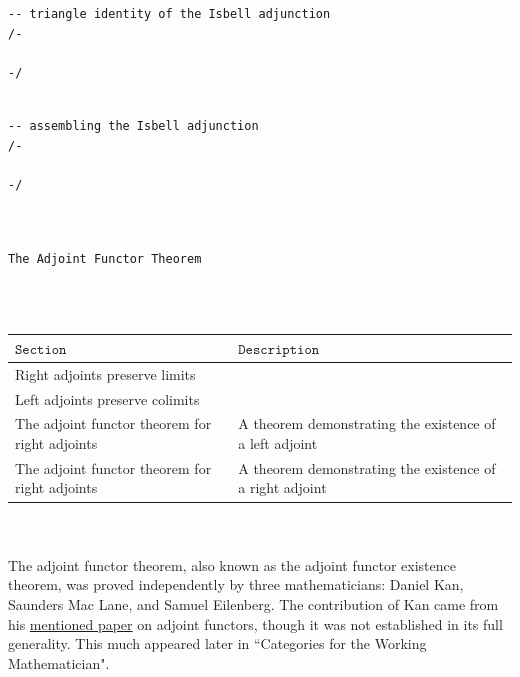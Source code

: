 \documentclass{book}
\theoremstyle{definition}
\newcounter{lcounter}
\renewcommand{\chapter}[1]{
\newpage
{
\Huge 
\begin{center}
\ \\
\ \\
\thispagestyle{empty}
\texttt{#1}
\end{center}}
\ \\
\ \\
}
\begin{document}
{{\begin{center}
\begin{tcolorbox}[width=5in,colback={white},title={\begin{center}\texttt{Lean \thelcounter} \addtocounter{lcounter}{1}  \end{center}},colbacktitle=Blue,coltitle=black]
\begin{verbatim}
-- triangle identity of the Isbell adjunction
/-

-/

\end{verbatim}
\end{tcolorbox}
\end{center}

\begin{center}
\begin{tcolorbox}[width=5in,colback={white},title={\begin{center}\texttt{Lean \thelcounter} \addtocounter{lcounter}{1}  \end{center}},colbacktitle=Blue,coltitle=black]
\begin{verbatim}

-- assembling the Isbell adjunction
/-

-/

\end{verbatim}
\end{tcolorbox}
\end{center}

\chapter{The Adjoint Functor Theorem}

{\footnotesize
\begin{center}
\begin{tabular}{|| l || l ||} 
 \hline
 $\texttt{Section}$ & $\texttt{Description}$ \\
 \hline
\hline
Right adjoints preserve limits &  \\
\hline
Left adjoints preserve colimits &  \\
\hline
The adjoint functor theorem for right adjoints & A theorem demonstrating the existence of a left adjoint \\
\hline
The adjoint functor theorem for right adjoints & A theorem demonstrating the existence of a right adjoint  \\
\hline
\end{tabular}
\end{center}}
\ \\
\ \\

The adjoint functor theorem, also known as the adjoint functor existence theorem, was proved independently by three mathematicians: Daniel Kan, Saunders Mac Lane, and Samuel Eilenberg. The contribution of Kan came from his \href{https://www.ams.org/journals/tran/1958-087-02/S0002-9947-1958-0131451-0/S0002-9947-1958-0131451-0.pdf}{mentioned paper} on adjoint functors, though it was not established in its full generality. This much appeared later in ``Categories for the Working Mathematician".\\


}}
\end{document}

